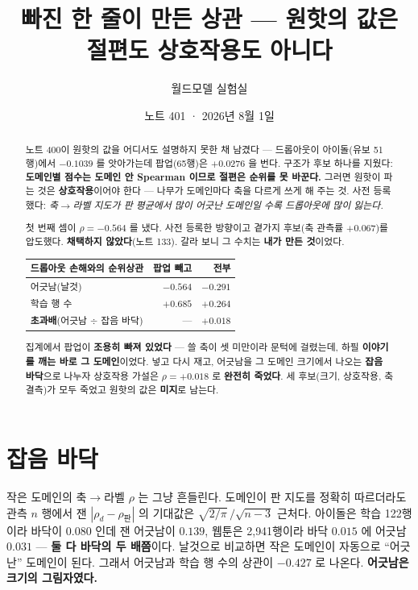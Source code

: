 \documentclass[11pt]{article}
\begin{document}
\title{빠진 한 줄이 만든 상관 --- 원핫의 값은 절편도 상호작용도 아니다}
\author{월드모델 실험실}
\date{노트 401 · 2026년 8월 1일}
\maketitle

\begin{abstract}
노트 400이 원핫의 값을 어디서도 설명하지 못한 채 남겼다 --- 드롭아웃이
아이돌(유보 51행)에서 $-0.1039$ 를 앗아가는데 팝업(65행)은 $+0.0276$ 을
번다. 구조가 후보 하나를 지웠다: \textbf{도메인별 점수는 도메인 안
Spearman 이므로 절편은 순위를 못 바꾼다.} 그러면 원핫이 파는 것은
\textbf{상호작용}이어야 한다 --- 나무가 도메인마다 축을 다르게 쓰게 해 주는
것. 사전 등록했다: \emph{축$\to$라벨 지도가 판 평균에서 많이 어긋난 도메인일
수록 드롭아웃에 많이 잃는다.}

첫 번째 셈이 $\rho = -0.564$ 를 냈다. 사전 등록한 방향이고 곁가지 후보(축
관측률 $+0.067$)를 압도했다. \textbf{채택하지 않았다}(노트 133). 갈라 보니
그 수치는 \textbf{내가 만든 것}이었다.

\begin{center}
\begin{tabular}{lrr}
\hline
드롭아웃 손해와의 순위상관 & 팝업 빼고 & \textbf{전부} \\
\hline
어긋남(날것) & $-0.564$ & $-0.291$ \\
학습 행 수 & $+0.685$ & $+0.264$ \\
\textbf{초과배}(어긋남 $\div$ 잡음 바닥) & --- & $\mathbf{+0.018}$ \\
\hline
\end{tabular}
\end{center}

집계에서 팝업이 \textbf{조용히 빠져 있었다} --- 쓸 축이 셋 미만이라
문턱에 걸렸는데, 하필 \textbf{이야기를 깨는 바로 그 도메인}이었다. 넣고
다시 재고, 어긋남을 그 도메인 크기에서 나오는 \textbf{잡음 바닥}으로 나누자
상호작용 가설은 $\rho = +0.018$ 로 \textbf{완전히 죽었다}. 세 후보(크기,
상호작용, 축 결측)가 모두 죽었고 원핫의 값은 \textbf{미지}로 남는다.
\end{abstract}

\section{잡음 바닥}

작은 도메인의 축$\to$라벨 $\rho$ 는 그냥 흔들린다. 도메인이 판 지도를 정확히
따르더라도 관측 $n$ 행에서 잰 $|\rho_d - \rho_{\text{판}}|$ 의 기대값은
$\sqrt{2/\pi}\,/\sqrt{n-3}$ 근처다. 아이돌은 학습 122행이라 바닥이 $0.080$
인데 잰 어긋남이 $0.139$, 웹툰은 2{,}941행이라 바닥 $0.015$ 에 어긋남
$0.031$ --- \textbf{둘 다 바닥의 두 배쯤}이다. 날것으로 비교하면 작은
도메인이 자동으로 ``어긋난'' 도메인이 된다. 그래서 어긋남과 학습 행 수의
상관이 $-0.427$ 로 나온다. \textbf{어긋남은 크기의 그림자였다.}
\end{document}
